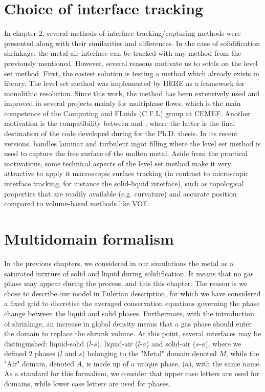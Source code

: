 \section{Choice of interface tracking}
In chapter 2, several methods of interface tracking/capturing methods were presented 
along with their similarities and differences. In the case of solidification shrinkage,
the metal-air interface can be tracked with any method from the previously mentioned.
However, several reasons motivate us to settle on the level set method. 
First, the easiest solution is testing a method which already exists in \cimlib library.
The level set method was implemented by HERE as a framework for monolithic resolution. Since this work,
the method has been extensively used and improved in several projects mainly for multiphase flows, which is the 
main competence of the Computing and FLuids (C.F.L) group at CEMEF. Another motivation is the compatibility
between \cimlib and \thercast, where the latter is the final destination of the code developed during for the Ph.D. thesis.
In its recent versions, \thercast handles laminar and turbulent ingot filling where the level set method is used 
to capture the free surface of the molten metal. Aside from the practical motivations, some technical aspects of the level
set method make it very attractive to apply it macroscopic surface tracking (in contrast to microscopic interface tracking, 
for instance the solid-liquid interface), such as topological properties that are readily available (e.g. curvature)
and accurate position compared to volume-based methods like VOF.
%
\section{Multidomain formalism}
In the previous chapters, we considered in our simulations the metal as a 
saturated mixture of solid and liquid during solidification.
It means that no gas phase may appear during the process, and this  this chapter.
The reason is we chose to describe our model in Eulerian description, 
for which we have considered a fixed grid to discretise the averaged conservation 
equations governing the phase change between the liquid and solid phases.
Furthermore, with the introduction of shrinkage, an increase in global density means 
that a gas phase should enter the domain to replace the shrunk volume.
At this point, several interfaces may be distinguished: liquid-solid ($l$-$s$), liquid-air ($l$-$a$) and solid-air ($s$-$a$), where 
we defined 2 phases ($l$ and $s$) belonging to the "Metal" domain denoted $M$, while the "Air" domain, denoted $A$, 
is made up of a unique phase, ($a$), with the same name. As a standard for this formalism, we consider that upper case letters
are used for domains, while lower case letters are used for phases.

